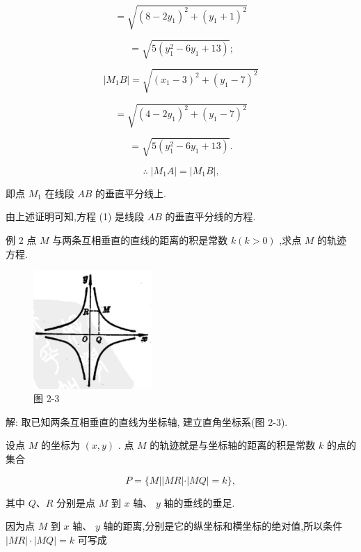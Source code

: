 \documentclass[lang=cn,newtx,10.5pt,scheme=chinese]{elegantbook}
\begin{document}
\[
  = \sqrt{{\left( 8 - 2{y}_{1}\right) }^{2} + {\left( {y}_{1} + 1\right) }^{2}}
\]

\[
  = \sqrt{5\left( {{y}_{1}^{2} - 6{y}_{1} + {13}}\right) }\text{;}
\]

\[
  \left| {{M}_{1}B}\right| = \sqrt{{\left( {x}_{1} - 3\right) }^{2} + {\left( {y}_{1} - 7\right) }^{2}}
\]

\[
  = \sqrt{{\left( 4 - 2{y}_{1}\right) }^{2} + {\left( {y}_{1} - 7\right) }^{2}}
\]

\[
  = \sqrt{5\left( {{y}_{1}^{2} - 6{y}_{1} + {13}}\right) }\text{.}
\]

\[
  \therefore \;\left| {{M}_{1}A}\right| = \left| {{M}_{1}B}\right| \text{,}
\]

即点 \({M}_{1}\) 在线段 \({AB}\) 的垂直平分线上.

由上述证明可知,方程 (1) 是线段 \({AB}\) 的垂直平分线的方程.

例 2 点 \(M\) 与两条互相垂直的直线的距离的积是常数 \(k\left( {k > 0}\right)\) ,求点 \(M\) 的轨迹方程.

\begin{figure}[h]
  \centering
  \includegraphics[max width=0.4\textwidth]{images/01912cc2-ffb6-728e-9ae7-b113ff05c64b_68_272250.jpg}
  \caption{图 2-3}
\end{figure}



解: 取已知两条互相垂直的直线为坐标轴, 建立直角坐标系(图 2-3).

设点 \(M\) 的坐标为 \(\left( {x,y}\right)\) . 点 \(M\) 的轨迹就是与坐标轴的距离的积是常数 \(k\) 的点的集合

\[
  P = \{ M\left| \right| {MR}\left| \cdot \right| {MQ} \mid = k\} ,
\]

其中 \(Q\text{、}R\) 分别是点 \(M\) 到 \(x\) 轴、 \(y\) 轴的垂线的垂足.

因为点 \(M\) 到 \(x\) 轴、 \(y\) 轴的距离,分别是它的纵坐标和横坐标的绝对值,所以条件 \(\left| {MR}\right| \cdot \left| {MQ}\right| = k\) 可写成
\end{document}
